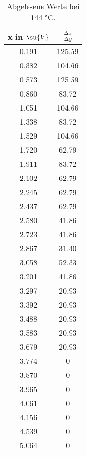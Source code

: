 \begin{table}
  \centering
  \caption{Abgelesene Werte bei 144 °C.}
  \label{tab:MessungA144}
  \begin{tabular}{c c}
    \toprule
    x in $\su{V}$ & $ \frac{\increment x}{\increment y}$ \\
    \midrule
    0.191 & 125.59 \\
    0.382 & 104.66 \\
    0.573 & 125.59 \\
    0.860 &  83.72 \\
    1.051 & 104.66 \\
    1.338 &  83.72 \\
    1.529 & 104.66 \\
    1.720 &  62.79 \\
    1.911 &  83.72 \\
    2.102 &  62.79 \\
    2.245 &  62.79 \\
    2.437 &  62.79 \\
    2.580 &  41.86 \\
    2.723 &  41.86 \\
    2.867 &  31.40 \\
    3.058 &  52.33 \\
    3.201 &  41.86 \\
    3.297 &  20.93 \\
    3.392 &  20.93 \\
    3.488 &  20.93 \\
    3.583 &  20.93 \\
    3.679 &  20.93 \\
    3.774 &  0  \\
    3.870 &  0  \\
    3.965 &  0  \\
    4.061 &  0  \\
    4.156 &  0  \\
    4.539 &  0  \\
    5.064 &  0  \\
    \bottomrule
  \end{tabular}
\end{table}
